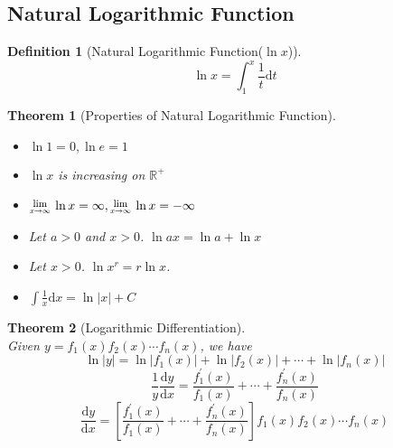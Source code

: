 \documentclass[12pt]{article}
\newcommand{\diff}{\mathrm{d}}
\newcommand{\Lim}[1]{\raisebox{0.5ex}{\scalebox{0.8}{$\displaystyle \lim_{#1}\;$}}}
\newtheorem{definition}{Definition}[section]
\newtheorem{theorem}{Theorem}[section]
\theoremstyle{definition}
\begin{document}
\subsection{Natural Logarithmic Function}
\begin{definition}[Natural Logarithmic Function($\ln x$)]
\hfill\\
\[
\ln x= \int ^{x}_{1}\frac{1}{t}\diff t
\]
\end{definition}
\begin{theorem}[Properties of Natural Logarithmic Function]
\hfill\\
\normalfont
\begin{itemize}
\item $\ln 1 = 0, \ln e = 1$
\item $\ln x$ is increasing on $\mathbb{R}^+$
\item $\Lim{x\to\infty}\ln x = \infty, \Lim{x\to\infty}\ln x = -\infty$
\item Let $a>0$ and $x>0$. $\ln ax=\ln a +\ln x$
\item Let $x>0$. $\ln x^r = r\ln x$.
\item $\int \frac{1}{x}\diff x = \ln |x| + C$
\end{itemize}
\end{theorem}
\begin{theorem}[Logarithmic Differentiation]
\hfill\\
\normalfont Given $y=f_1(x)f_2(x)\cdots f_n(x)$, we have
\[
\ln|y| = \ln|f_1(x)|+\ln|f_2(x)|+\cdots+ \ln|f_n(x)|
\]
\[
\frac{1}{y}\frac{\diff y}{\diff x} = \frac{f^\prime_1(x)}{f_1(x)}+\cdots+\frac{f^\prime_n(x)}{f_n(x)}
\]
\[
\frac{\diff y}{\diff x} = \left[\frac{f^\prime_1(x)}{f_1(x)}+\cdots+\frac{f^\prime_n(x)}{f_n(x)}\right]f_1(x)f_2(x)\cdots f_n(x)
\]
\end{theorem}
\end{document}
